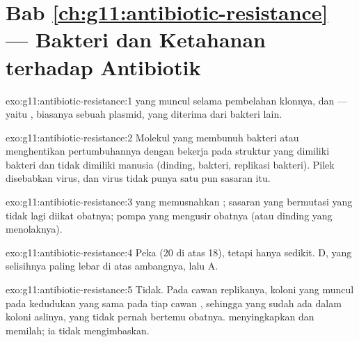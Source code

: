 \section*{Bab \ref{ch:g11:antibiotic-resistance} --- Bakteri dan Ketahanan terhadap Antibiotik}

\begin{solution}{exo:g11:antibiotic-resistance:1}
 yang muncul selama pembelahan klonnya, dan  --- yaitu , biasanya sebuah plasmid, yang diterima dari
bakteri lain.
\end{solution}

\begin{solution}{exo:g11:antibiotic-resistance:2}
Molekul yang membunuh bakteri atau menghentikan pertumbuhannya dengan
bekerja pada struktur yang dimiliki bakteri dan tidak dimiliki 
manusia (dinding,  bakteri,  replikasi bakteri). Pilek
disebabkan virus, dan virus tidak punya satu pun sasaran itu.
\end{solution}

\begin{solution}{exo:g11:antibiotic-resistance:3}
 yang memusnahkan ; sasaran yang bermutasi yang tidak
lagi diikat obatnya; pompa yang mengusir obatnya (atau dinding yang
menolaknya).
\end{solution}

\begin{solution}{exo:g11:antibiotic-resistance:4}
Peka (20 di atas 18), tetapi hanya sedikit. D, yang selisihnya paling
lebar di atas ambangnya, lalu A.
\end{solution}

\begin{solution}{exo:g11:antibiotic-resistance:5}
Tidak. Pada cawan replikanya, koloni yang  muncul pada kedudukan
yang sama pada tiap cawan , sehingga  yang  sudah
ada dalam koloni aslinya, yang tidak pernah bertemu obatnya.
 menyingkapkan dan memilah; ia tidak mengimbaskan.
\end{solution}

